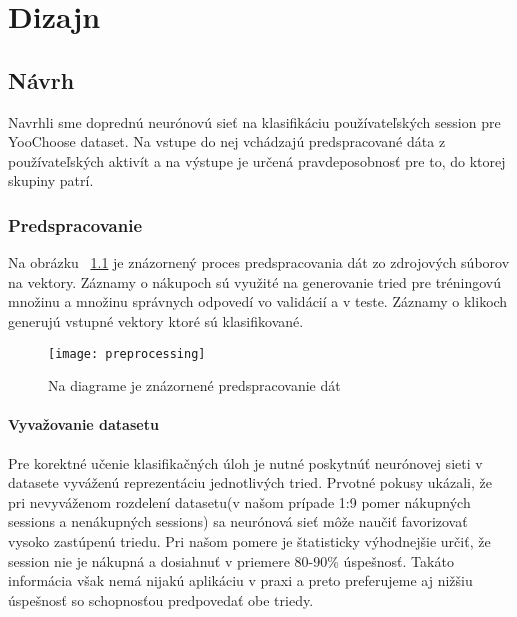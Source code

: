\newpage
\chapter{Dizajn} 

\section{Návrh}
\label{design}

Navrhli sme doprednú neurónovú sieť na klasifikáciu používateľských session pre YooChoose dataset. Na vstupe do nej vchádzajú predspracované dáta z používateľských aktivít a na výstupe je určená pravdeposobnosť pre to, do ktorej skupiny patrí.

\subsection{Predspracovanie}

Na obrázku ~\ref{fig:preprocessing} je znázornený proces predspracovania dát zo zdrojových súborov na vektory. Záznamy o nákupoch sú využité na generovanie tried pre tréningovú množinu a množinu správnych odpovedí vo validácií a v teste. Záznamy o klikoch generujú vstupné vektory ktoré sú klasifikované.

\begin{figure}[H]
	\begin{center}
		\texttt{[image: preprocessing]}\end{center}
	\caption[preprocessing]{Na diagrame je znázornené predspracovanie dát}
	\label{fig:preprocessing}
\end{figure}

\subsubsection{Vyvažovanie datasetu}
Pre korektné učenie klasifikačných úloh je nutné poskytnúť neurónovej sieti v datasete vyváženú reprezentáciu jednotlivých tried. Prvotné pokusy ukázali, že pri nevyváženom rozdelení datasetu(v našom prípade 1:9 pomer nákupných sessions a nenákupných sessions) sa neurónová sieť môže naučiť favorizovať vysoko zastúpenú triedu. \newline
Pri našom pomere je štatisticky výhodnejšie určiť, že session nie je nákupná a dosiahnuť v priemere 80-90\% úspešnosť. Takáto informácia však nemá nijakú aplikáciu v praxi a preto preferujeme aj nižšiu úspešnosť so schopnosťou predpovedať obe triedy.\newline

